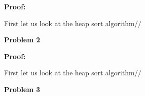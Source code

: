 \documentclass[12pt]{article}
\begin{document}
\par
\bigskip
{\bf Proof:}
\par
First let us look at the heap sort algorithm//

\rightline{$\blacksquare$}

\par

\par
\bigskip
{\bf Problem
    2
}

\par
\bigskip
{\bf Proof:}
\par
First let us look at the heap sort algorithm//

\rightline{$\blacksquare$}

\par

\par
\bigskip
{\bf Problem
    3
}
\end{document}
